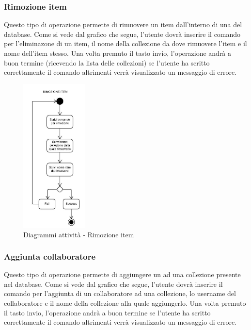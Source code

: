 \documentclass{scalatekids-article}
\begin{document}
\subsubsection{Rimozione item}
Questo tipo di operazione permette di rimuovere un item dall'interno di una  del database.
Come si vede dal grafico che segue, l'utente dovrà inserire il comando per l'eliminazone di un item, il nome della collezione da dove rimuovere l'item e il nome dell'item stesso.
Una volta premuto il tasto invio, l'operazione andrà a buon termine (ricevendo la lista delle collezioni) se l'utente ha scritto correttamente il comando altrimenti verrà visualizzato un messaggio di errore.

\begin{figure}[H]
	\begin{center}
		\includegraphics[width=0.3\textwidth, keepaspectratio]{img/diagrammiAttivita/rimozioneItem.jpeg}
		\caption{Diagrammi attività - Rimozione item}
	\end{center}
\end{figure}

\subsubsection{Aggiunta collaboratore}
Questo tipo di operazione permette di aggiungere un  ad una collezione presente nel database.
Come si vede dal grafico che segue, l'utente dovrà inserire il comando per l'aggiunta di un collaboratore ad una collezione, lo username del collaboratore e il nome della collezione alla quale aggiungerlo.
Una volta premuto il tasto invio, l'operazione andrà a buon termine se l'utente ha scritto correttamente il comando altrimenti verrà visualizzato un messaggio di errore.
\end{document}
